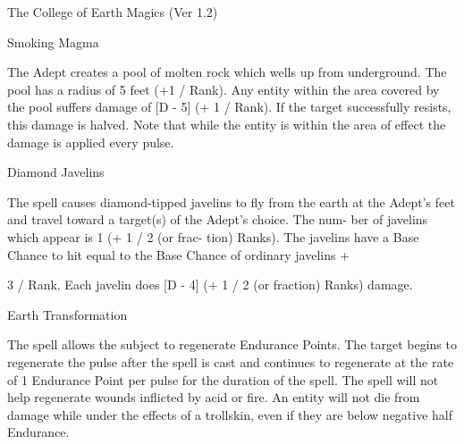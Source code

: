 \begin{Chapter}{The College of Earth Magics (Ver 1.2)}
\begin{spell}[S-17]{Smoking Magma }
\begin{effects}
 The  Adept  creates  a  pool  of  molten  rock 
which  wells  up  from underground.  The  pool  has a 
radius of 5 feet (+1 / Rank). Any entity within the 
area covered by the pool suffers damage of [D - 5] 
(+  1  / Rank).  If  the  target  successfully  resists, this 
damage  is  halved.  Note  that  while  the  entity  is 
within  the  area  of  effect  the  damage  is  applied 
every pulse. 

\end{effects}
\end{spell}

\begin{spell}[S-18]{Diamond Javelins }

\begin{effects}
 The  spell  causes  diamond-tipped  javelins 
to fly from the earth at the Adept’s feet and travel 
toward a target(s) of the Adept’s choice. The num-
ber of javelins which appear is 1 (+ 1 / 2 (or frac-
tion)  Ranks).  The  javelins  have  a  Base  Chance  to 
hit equal to the Base Chance of ordinary javelins + 

3  /  Rank.  Each  javelin  does  [D  -  4]  (+  1  /  2  (or 
fraction) Ranks) damage. 


\end{effects}
\end{spell}

\begin{spell}[S-19]{Earth Transformation }

\begin{effects}
 The  spell  allows  the  subject  to  regenerate 
Endurance  Points.  The  target  begins  to  regenerate 
the  pulse  after  the  spell  is  cast  and  continues  to 
regenerate  at  the  rate  of  1  Endurance  Point  per 
pulse  for  the  duration  of  the  spell.  The  spell  will 
not  help  regenerate  wounds  inflicted  by  acid  or 
fire.  An  entity  will  not  die  from  damage  while 
under  the  effects  of  a  trollskin,  even  if  they  are 
below negative half Endurance. 



\end{effects}
\end{spell}
\end{Chapter}
